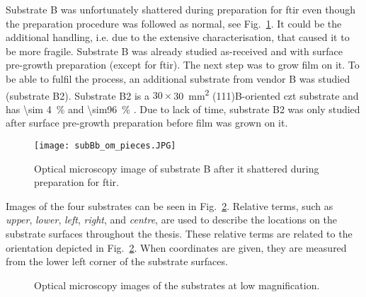 Substrate B was unfortunately shattered during preparation for \ac{ftir} even though the preparation procedure was followed as normal, see Fig.~\ref{fig:subB_om_6x_pieces}. It could be the additional handling, i.e. due to the extensive characterisation, that caused it to be more fragile. Substrate B was already studied as-received and with surface pre-growth preparation (except for \ac{ftir}). The next step was to grow  film on it. To be able to fulfil the process, an additional substrate from vendor B was studied (substrate B2). Substrate B2 is a $30\times$\SI{30}{\milli\metre^2} (111)B-oriented \ac{czt} substrate and has \SI{\sim 4}{\percent}  and \SI{\sim96}{\percent} . Due to lack of time, substrate B2 was only studied after surface pre-growth preparation before  film was grown on it.

\begin{figure}[htbp]
    \centering
    \texttt{[image: subBb\_om\_pieces.JPG]}
    \caption[Optical microscopy image of substrate B after it shattered.]{Optical microscopy image of substrate B after it shattered during preparation for \ac{ftir}.}
    \label{fig:subB_om_6x_pieces}
\end{figure}

Images of the four substrates can be seen in Fig.~\ref{fig:substrateABC}. Relative terms, such as \emph{upper}, \emph{lower}, \emph{left}, \emph{right}, and \emph{centre}, are used to describe the locations on the substrate surfaces throughout the thesis. These relative terms are related to the orientation depicted in Fig.~\ref{fig:substrateABC}. When coordinates are given, they are measured from the lower left corner of the substrate surfaces. %

\begin{figure}[htbp]
    \centering
    \caption[Optical microscopy images of the substrates at low magnification.]{Optical microscopy images of the substrates at low magnification.}
    \label{fig:substrateABC}
\end{figure}

